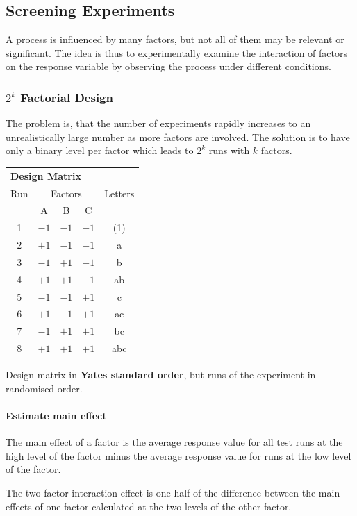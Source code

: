 \documentclass[11pt]{article}
\theoremstyle{definition}
\begin{document}
\subsection{Screening Experiments}
A process is influenced by many factors, but not all of them may be relevant or significant. The idea is thus to experimentally examine the interaction of factors on the response variable by observing the process under different conditions.

\subsubsection{$2^k$ Factorial Design}
The problem is, that the number of experiments rapidly increases to an unrealistically large number as more factors are involved. The solution is to have only a binary level per factor which leads to $2^k$ runs with $k$ factors.
\begin{tabularx}{\linewidth}{c | c c c | c}
	\multicolumn{5}{l}{\textbf{Design Matrix}}\\[0.5em]
	Run & \multicolumn{3}{c|}{Factors} & Letters\\
	& A & B & C & \\
	\hline
	1 & $-1$ & $-1$ & $-1$ & (1) \\
	2 & $+1$ & $-1$ & $-1$ & a   \\
	3 & $-1$ & $+1$ & $-1$ & b   \\
	4 & $+1$ & $+1$ & $-1$ & ab  \\
	5 & $-1$ & $-1$ & $+1$ & c   \\
	6 & $+1$ & $-1$ & $+1$ & ac  \\
	7 & $-1$ & $+1$ & $+1$ & bc  \\
	8 & $+1$ & $+1$ & $+1$ & abc \\
\end{tabularx}
Design matrix in \textbf{Yates standard order}, but runs of the experiment in randomised order.

\paragraph{Estimate main effect} The main effect of a factor is the average response value for all test runs at the high level of the factor minus the average response value for runs at the low level of the factor.

The two factor interaction effect is one-half of the difference between the main effects of one factor calculated at the two levels of the other factor.
\end{document}

